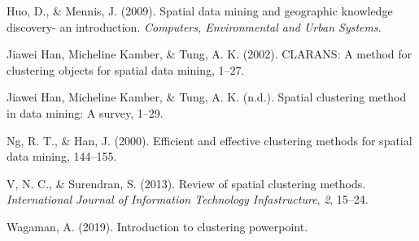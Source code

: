 \documentclass[12pt,twoside]{amherstthesis}
\begin{document}
  \hypertarget{ref-Rec1}{}
  Huo, D., \& Mennis, J. (2009). Spatial data mining and geographic
  knowledge discovery- an introduction. \emph{Computers, Environmental and
  Urban Systems}.
  
  \hypertarget{ref-Rec3}{}
  Jiawei Han, Micheline Kamber, \& Tung, A. K. (2002). CLARANS: A method
  for clustering objects for spatial data mining, 1--27.
  
  \hypertarget{ref-Rec2}{}
  Jiawei Han, Micheline Kamber, \& Tung, A. K. (n.d.). Spatial clustering
  method in data mining: A survey, 1--29.
  
  \hypertarget{ref-Rec6}{}
  Ng, R. T., \& Han, J. (2000). Efficient and effective clustering methods
  for spatial data mining, 144--155.
  
  \hypertarget{ref-Rec5}{}
  V, N. C., \& Surendran, S. (2013). Review of spatial clustering methods.
  \emph{International Journal of Information Technology Infastructure},
  \emph{2}, 15--24.
  
  \hypertarget{ref-ppt}{}
  Wagaman, A. (2019). Introduction to clustering powerpoint.


\end{document}
